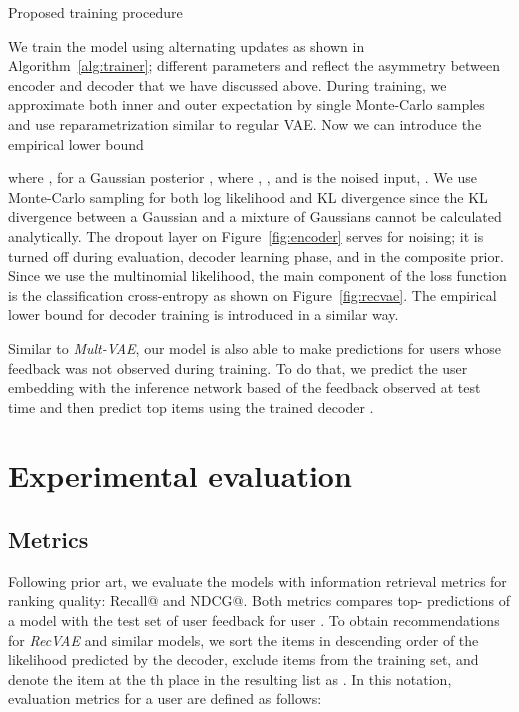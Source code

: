 \documentclass[sigconf,authorversion]{acmart}
\begin{document}
\begin{algorithm}[t]
\caption{Proposed training procedure}\label{alg:trainer}
    \KwData{}
    \KwResult{,  }
\end{algorithm}

We train the model using alternating updates as shown in Algorithm~\ref{alg:trainer}; different parameters  and  reflect the asymmetry between encoder and decoder that we have discussed above. During training, we approximate both inner and outer expectation by single Monte-Carlo samples and use reparametrization similar to regular VAE.
Now we can introduce the empirical lower bound 

where , for a Gaussian posterior , where , , and  is the noised input, . We use Monte-Carlo sampling for both log likelihood and KL divergence since the KL divergence between a Gaussian and a mixture of Gaussians cannot be calculated analytically. The dropout layer on Figure~\ref{fig:encoder} serves for noising; it is turned off during evaluation, decoder learning phase, and in the composite prior. Since we use the multinomial likelihood, the main component of the loss function is the classification cross-entropy as shown on Figure~\ref{fig:recvae}. The empirical lower bound for decoder training  is introduced in a similar way.

Similar to \emph{Mult-VAE}, our model is also able to make predictions for users whose feedback was not observed during training. To do that, we predict the user embedding with the inference network  based of the feedback  observed at test time and then predict top items using the trained decoder .

\section{Experimental evaluation}\label{sec:experiments}

\subsection{Metrics}

Following prior art, we evaluate the models with information retrieval metrics for ranking quality: Recall@ and NDCG@. Both metrics compares top- predictions of a model with the test set  of user feedback for user .
To obtain recommendations for \emph{RecVAE} and similar models, we sort the items in descending order of the likelihood predicted by the decoder, exclude items from the training set, and denote the item at the th place in the resulting list as . In this notation, evaluation metrics for a user  are defined as follows:
\end{document}
